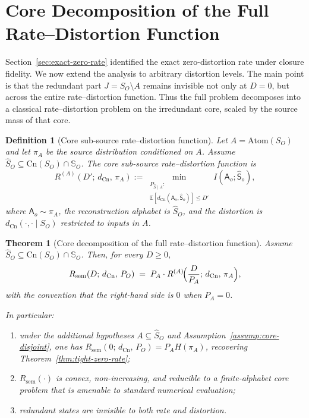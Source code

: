 \documentclass[journal,onecolumn]{IEEEtran}
\newcommand{\Atom}{\text{Atom}}
\newcommand{\Cn}{\text{Cn}}
\newcommand{\E}{\mathbb{E}}
\newtheorem{theorem}{Theorem}[section]
\newtheorem{definition}{Definition}[section]
\numberwithin{equation}{section}
\begin{document}
\section{Core Decomposition of the Full Rate--Distortion Function}
\label{sec:core-decomposition}

Section~\ref{sec:exact-zero-rate} identified the exact
zero-distortion rate under closure fidelity.
We now extend the analysis to arbitrary distortion levels.
The main point is that the redundant part \(J=S_O\setminus A\)
remains invisible not only at \(D=0\), but across the entire
rate--distortion function.
Thus the full problem decomposes into a classical
rate--distortion problem on the irredundant core, scaled by the
source mass of that core.

\begin{definition}[Core sub-source rate--distortion function]
\label{def:core-rd}
Let \(A=\Atom(S_O)\) and let \(\pi_A\) be the source
distribution conditioned on \(A\).
Assume \(\hat S_O\subseteq\Cn(S_O)\cap\mathbb{S}_O\).
The \emph{core sub-source rate--distortion function} is
\begin{equation}\label{eq:core-rd}
  R^{(A)}(D';\,d_{\Cn},\,\pi_A)
  :=
  \min_{\substack{P_{\hat S\mid A}:\\
  \E[d_{\Cn}(\mathsf{A}_o,\hat {\mathsf{S}}_o)]\le D'}}
  I(\mathsf{A}_o;\hat{\mathsf{S}}_o),
\end{equation}
where \(\mathsf{A}_o\sim\pi_A\), the reconstruction alphabet is
\(\hat S_O\), and the distortion is
\(d_{\Cn}(\cdot,\cdot\mid S_O)\) restricted to inputs in \(A\).
\end{definition}

\begin{theorem}[Core decomposition of the full
rate--distortion function]
\label{thm:rd-decomposition}
Assume \(\hat S_O\subseteq\Cn(S_O)\cap\mathbb{S}_O\).
Then, for every \(D\ge 0\),
\begin{equation}\label{eq:rd-decomp}
  R_{\mathrm{sem}}(D;\,d_{\Cn},\,P_O)
  \;=\;
  P_A\cdot
  R^{(A)}\!\Bigl(\frac{D}{P_A};\,d_{\Cn},\,\pi_A\Bigr),
\end{equation}
with the convention that the right-hand side is \(0\) when
\(P_A=0\).

In particular:
\begin{enumerate}[label=\textup{(\roman*)}]
  \item under the additional hypotheses
        \(A\subseteq\hat S_O\) and
        Assumption~\textup{\ref{assump:core-disjoint}},
        one has
        \(R_{\mathrm{sem}}(0;\,d_{\Cn},\,P_O)=P_AH(\pi_A)\),
        recovering Theorem~\textup{\ref{thm:tight-zero-rate}};
  \item \(R_{\mathrm{sem}}(\cdot)\) is convex,
      non-increasing, and reducible to a finite-alphabet
      core problem that is amenable to standard numerical
      evaluation;
  \item redundant states are invisible to both rate and
        distortion.
\end{enumerate}
\end{theorem}
\end{document}
